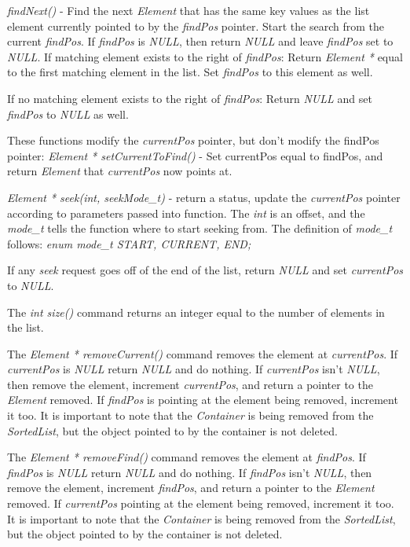 \documentclass[11pt]{report}
\begin{document}
{\it findNext()} - Find the next {\it Element} that has the same key
values as the list element currently pointed to by the {\it findPos}
pointer.  Start the search from the current {\it findPos}.  If
{\it findPos} is {\it NULL}, then return {\it NULL} and leave
{\it findPos} set to {\it NULL}.  If matching element exists to the
right of {\it findPos}: Return {\it Element *} equal to the first
matching element in the list.  Set {\it findPos} to this element as
well.

If no matching element exists to the right of {\it findPos}: Return
{\it NULL} and set {\it findPos} to {\it NULL} as well.

These functions modify the {\it currentPos} pointer, but don't modify
the findPos pointer:
{\it Element * setCurrentToFind()} - Set currentPos equal to findPos,
and return {\it Element} that {\it currentPos} now points at.

{\it Element * seek(int, seekMode\_t)} - return a status, update the
{\it currentPos} pointer according to parameters passed into function.
The {\it int} is an offset, and the {\it mode\_t} tells the function
where to start seeking from.  The definition of {\it mode\_t} follows:
{\it enum mode\_t  {START, CURRENT, END};}

If any {\it seek} request goes off of the end of the list, return
{\it NULL} and set {\it currentPos} to {\it NULL}.

The {\it int size()} command returns an integer equal to the number of
elements in the list.

The {\it Element * removeCurrent()} command removes the element at
{\it currentPos}.  If {\it currentPos} is {\it NULL} return
{\it NULL} and do nothing.  If {\it currentPos} isn't {\it NULL},
then remove the element, increment {\it currentPos}, and return a
pointer to the {\it Element} removed.  If {\it findPos} is pointing at
the element being removed, increment it too.  It is important to note
that the {\it Container} is being removed from the {\it SortedList},
but the object pointed to by the container is not deleted.

The {\it Element * removeFind()} command removes the element at
{\it findPos}.  If {\it findPos} is {\it NULL} return {\it NULL} and
do nothing.  If {\it findPos} isn't {\it NULL}, then remove the
element, increment {\it findPos}, and return a pointer to the
{\it Element} removed.  If {\it currentPos} pointing at the element
being removed, increment it too.   It is important to note
that the {\it Container} is being removed from the {\it SortedList},
but the object pointed to by the container is not deleted.
\end{document}
